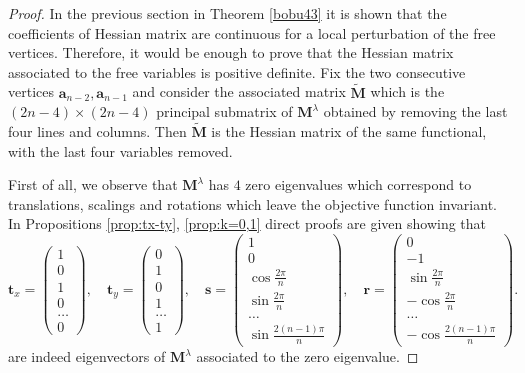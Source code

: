 \documentclass[JEP,XML,SOM,Unicode,ThmDefs,NoFloatCountersInSection,published]{cedram}
\theoremstyle{plain}
\theoremstyle{definition}
\newcommand{\bo}[1]{{\boldsymbol#1}}
\begin{document}
\begin{proof} In the previous section in Theorem \ref{bobu43} it is shown that the coefficients of Hessian matrix are continuous for a local perturbation of the free vertices. Therefore, it would be enough to prove that the Hessian matrix associated to the free variables is positive definite. Fix the two consecutive vertices $\bo a_{n-2},\bo a_{n-1}$ and consider the associated matrix $\widetilde{\bo{M}}$ which is the $(2n-4)\times(2n-4)$ principal submatrix of $\bo M^\lambda$ obtained by removing the last four lines and columns. Then $\widetilde{\bo{M}}$ is the Hessian matrix of the same functional, with the last four variables removed.

First of all, we observe that $\bo M^\lambda$ has $4$ zero eigenvalues which correspond to translations, scalings and rotations which leave the objective function invariant. In Propositions \ref{prop:tx-ty}, \ref{prop:k=0,1} direct proofs are given showing that
\begin{equation}\bo t_x= \begin{pmatrix} 1\\0\\1\\0\\ \dots\\0\end{pmatrix},\quad \bo t_y= \begin{pmatrix} 0\\1\\0\\1\\ \dots\\1 \end{pmatrix},\quad \bo s=\begin{pmatrix} 1\\ 0\\ \cos\frac {2\pi}{n} \\ \sin\frac {2\pi}{n}\\ \dots\\\sin \frac{2(n-1) \pi}{n} \end{pmatrix}, \quad\bo r=\begin{pmatrix} 0\\-1\\\sin \frac{2 \pi}{n} \\- \cos\frac {2\pi}{n} \\ \dots\\ -\cos \frac{2(n-1) \pi}{n} \end{pmatrix}.
\label{eq:eigenvectors-zero}
\end{equation}
are indeed eigenvectors of $\bo M^\lambda$ associated to the zero eigenvalue.


\end{proof}
\end{document}
